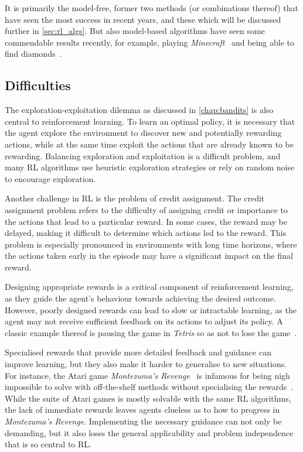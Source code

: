 It is primarily the model-free, former two methods (or combinations thereof) that have seen the most success in recent years, and these which will be discussed further in \cref{sec:rl_algs}.
But also model-based algorithms have seen some commendable results recently, for example, playing \textit{Minecraft}~\autocite{minecraft} and being able to find diamonds~\autocite{hafner2023}.


\subsection{Difficulties}
\label{sec:difficulties}
The exploration-exploitation dilemma as discussed in \cref{chap:bandits} is also central to reinforcement learning.
To learn an optimal policy, it is necessary that the agent explore the environment to discover new and potentially rewarding actions, while at the same time exploit the actions that are already known to be rewarding.
Balancing exploration and exploitation is a difficult problem, and many RL algorithms use heuristic exploration strategies or rely on random noise to encourage exploration.

Another challenge in RL is the problem of credit assignment.
The credit assignment problem refers to the difficulty of assigning credit or importance to the actions that lead to a particular reward.
In some cases, the reward may be delayed, making it difficult to determine which actions led to the reward.
This problem is especially pronounced in environments with long time horizons, where the actions taken early in the episode may have a significant impact on the final reward.

Designing appropriate rewards is a critical component of reinforcement learning, as they guide the agent's behaviour towards achieving the desired outcome.
However, poorly designed rewards can lead to slow or intractable learning, as the agent may not receive sufficient feedback on its actions to adjust its policy.
A classic example thereof is pausing the game in \textit{Tetris} so as not to lose the game~\autocite{murphy2013}.

Specialised rewards that provide more detailed feedback and guidance can improve learning, but they also make it harder to generalise to new situations.
For instance, the Atari game \textit{Montezuma's Revenge}~\autocite{montezuma} is infamous for being nigh impossible to solve with off-the-shelf methods without specialising the rewards~\autocite{salimans2018}.
While the suite of Atari games is mostly solvable with the same RL algorithms, the lack of immediate rewards leaves agents clueless as to how to progress in \textit{Montezuma's Revenge}.
Implementing the necessary guidance can not only be demanding, but it also loses the general applicability and problem independence that is so central to RL.

